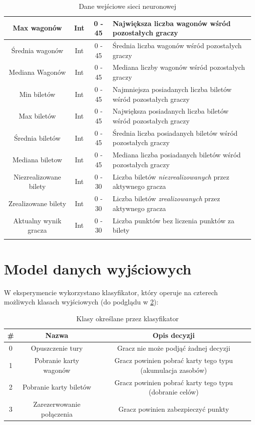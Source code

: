 \documentclass[12pt, oneside]{report}
\begin{document}
\begin{longtable}[h]{| c | c | c | p{6.5cm} |}
	Max wagonów  & Int & 0 - 45 & Największa liczba wagonów wśród pozostałych graczy \\ \hline
    Średnia wagonów  & Int & 0 - 45 & Średnia liczba wagonów wśród pozostałych graczy  \\ \hline
	Mediana Wagonów & Int & 0 - 45 & Mediana liczby wagonów wśród pozostałych graczy  \\ \hline
	Min biletów & Int & 0 - 45 & Najmniejsza posiadanych liczba biletów wśród pozostałych graczy  \\ \hline
	Max biletów & Int & 0 - 45 & Największa posiadanych liczba biletów wśród pozostałych graczy  \\ \hline
	Średnia biletów & Int & 0 - 45 & Średnia liczba posiadanych biletów wśród pozostałych graczy  \\ \hline
	Mediana biletow & Int & 0 - 45 & Mediana liczba posiadanych biletów wśród pozostałych graczy  \\ \hline
	Niezrealizowane bilety & Int & 0 - 30 & Liczba biletów \textit{niezrealizowanych} przez aktywnego gracza \\ \hline
	Zrealizowane bilety & Int & 0 - 30 & Liczba biletów \textit{zrealizowanych} przez aktywnego gracza \\ \hline
	Aktualny wynik gracza & Int & 0 - 30 & Liczba punktów bez liczenia punktów za bilety \\ \hline
\caption{Dane wejściowe sieci neuronowej}
\label{table:algo_input}
\end{longtable}

\section{Model danych wyjściowych}
W eksperymencie wykorzystano klasyfikator, który operuje na czterech możliwych klasach wyjściowych (do podglądu w \ref{table:algo_classifcator}):
\begin{table}[h]	
	\begin{center}
		\begin{tabular}{| c | c | c |} \hline
			\# & Nazwa & Opis decyzji \\ \hline
			0 & Opuszczenie tury & Gracz nie może podjąć żadnej decyzji \\ \hline
			1 & Pobranie karty wagonów & Gracz powinien pobrać karty tego typu (akumulacja zasobów) \\ \hline
			2 & Pobranie karty biletów & Gracz powinien pobrać karty tego typu (dobranie celów) \\ \hline
			3 & Zarezerwowanie połączenia & Gracz powinien zabezpieczyć punkty \\ \hline
		\end{tabular}
		\caption{Klasy określane przez klasyfikator}
		\label{table:algo_classifcator}
	\end{center}
\end{table}
\end{document}
